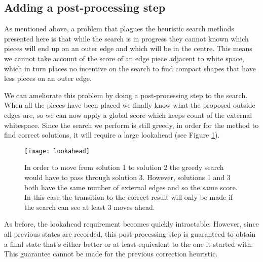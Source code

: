 \subsection{Adding a post-processing step}
As mentioned above, a problem that plagues the heuristic search methods presented here is that while the search is in progress they cannot known which pieces will end up on an outer edge and which will be in the centre. This means we cannot take account of the score of an edge piece adjacent to white space, which in turn places no incentive on the search to find compact shapes that have less pieces on an outer edge.

We can ameliorate this problem by doing a post-processing step to the search. When all the pieces have been placed we finally know what the proposed outside edges are, so we can now apply a global score which keeps count of the external whitespace. Since the search we perform is still greedy, in order for the method to find correct solutions, it will require a large lookahead (see Figure \ref{fig:lookahead}). 
\begin{figure}[H]
  \centering
  \texttt{[image: lookahead]}
  \caption{In order to move from solution 1 to solution 2 the greedy search would have to pass through solution 3. However, solutions 1 and 3 both have the same number of external edges and so the same score. In this case the transition to the correct result will only be made if the search can see at least 3 moves ahead.}
  \label{fig:lookahead}
\end{figure}
As before, the lookahead requirement becomes quickly intractable. However, since all previous states are recorded, this post-processing step is guaranteed to obtain a final state that's either better or at least equivalent to the one it started with. This guarantee cannot be made for the previous correction heuristic.


